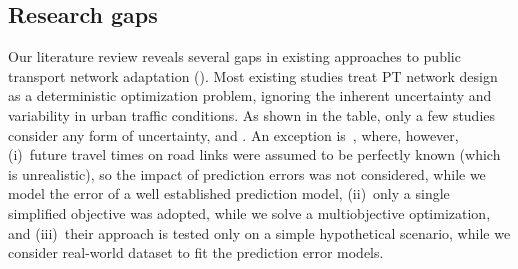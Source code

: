 \documentclass[a4paper,fleqn]{cas-sc}
\begin{document}
\subsection{Research gaps}
Our literature review reveals several gaps in existing approaches to public transport network adaptation ().
%
Most existing studies treat PT network design as a deterministic optimization problem, ignoring the inherent uncertainty and variability in urban traffic conditions. As shown in the table, only a few studies consider any form of uncertainty, and .
%
An exception is~\cite{guo2025data}, where, however, (i)~future travel times on road links were assumed to be perfectly known (which is unrealistic), so the impact of prediction errors was not considered, while we model the error of a well established prediction model, (ii)~only a single simplified objective was adopted, while we solve a multiobjective optimization, and (iii)~their approach is tested only on a simple hypothetical scenario, while we consider real-world dataset to fit the prediction error models.
\end{document}
